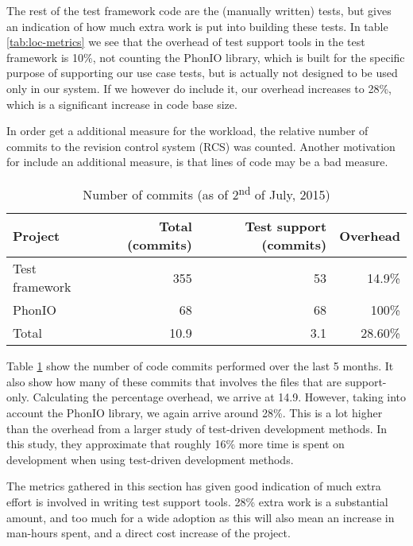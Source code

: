 \noindent The rest of the test framework code are the (manually written) tests, but gives an indication of how much extra work is put into building these tests. In table \ref{tab:loc-metrics} we see that the overhead of test support tools in the test framework is 10\%, not counting the PhonIO library, which is built for the specific purpose of supporting our use case tests, but is actually not designed to be used only in our system. If we however do include it, our overhead increases to 28\%, which is a significant increase in code base size.\medskip

\noindent In order get a additional measure for the workload, the relative number of commits to the revision control system (RCS) was counted. Another motivation for include an additional measure, is that lines of code may be a bad measure\cite{fraser2013does}.\medskip

\begin{table}[!htbp]
\centering
\begin{tabular}{ | l | r | r | r |}
   \hline
   Project        & Total (commits) & Test support (commits) & Overhead \\ \hline
   Test framework & 355             & 53                     & 14.9\%   \\
   PhonIO         & 68              & 68                     & 100\%    \\
   \hline
   Total          & 10.9            & 3.1                    & 28.60\%  \\
   \hline
   
\end{tabular}
\caption{Number of commits (as of 2\textsuperscript{nd} of July, 2015)}
\label{tab:metrics-commit-count}
\end{table}

\noindent Table \ref{tab:metrics-commit-count} show the number of code commits performed over the last 5 months. It also show how many of these commits that involves the files that are support-only. Calculating the percentage overhead, we arrive at 14.9. However, taking into account the PhonIO library, we again arrive around 28\%. This is a lot higher than the overhead from a larger study of test-driven development methods\cite{george2003}. In this study, they approximate that roughly 16\% more time is spent on development when using test-driven development methods.\medskip

\noindent The metrics gathered in this section has given good indication of much extra effort is involved in writing test support tools. 28\% extra work is a substantial amount, and too much for a wide adoption as this will also mean an increase in man-hours spent, and a direct cost increase of the project.\medskip

